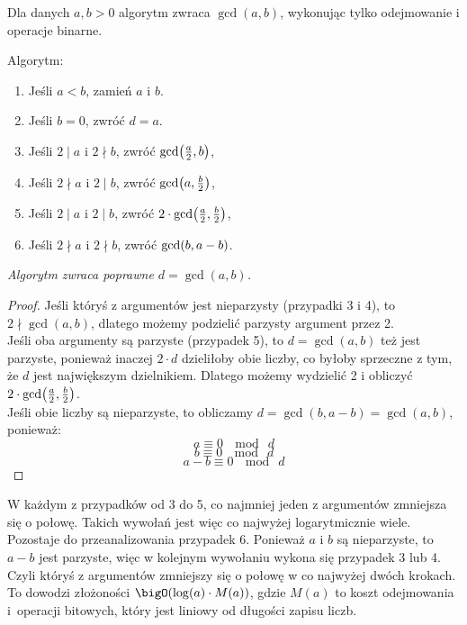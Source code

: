 Dla danych \( a,b > 0 \) algorytm zwraca \( \gcd(a,b) \), wykonując tylko odejmowanie i operacje binarne.

\begin{greyframe}
	Algorytm:
	\begin{enumerate}
		\item Jeśli \( a < b \), zamień \( a \) i \( b \).
		\item Jeśli \( b = 0 \), zwróć \( d = a \).
		\item Jeśli \( 2 \mid a \) i \( 2 \nmid b \), zwróć \( \gcd\pars{\frac{a}{2}, b} \),
		\item Jeśli \( 2 \nmid a \) i \( 2 \mid b \), zwróć \( \gcd\pars{a, \frac{b}{2}} \),
		\item Jeśli \( 2 \mid a \) i \( 2 \mid b \), zwróć \( 2 \cdot \gcd\pars{\frac{a}{2}, \frac{b}{2}} \),
		\item Jeśli \( 2 \nmid a \) i \( 2 \nmid b \), zwróć \( \gcd\pars{b, a - b} \).
	\end{enumerate}
\end{greyframe}

\vspace{1em}\noindent
\textit{Algorytm zwraca poprawne \( d = \gcd(a, b) \).}
\begin{proof}
	Jeśli któryś z argumentów jest nieparzysty (przypadki 3 i 4), to \( 2 \nmid \gcd(a, b) \), dlatego możemy podzielić parzysty argument przez 2. \\
	Jeśli oba argumenty są parzyste (przypadek 5), to \( d = \gcd(a, b) \) też jest parzyste, ponieważ inaczej \( 2 \cdot d \) dzieliłoby obie liczby, co byłoby sprzeczne z tym, że \( d \) jest największym dzielnikiem.
	Dlatego możemy wydzielić 2 i obliczyć \( 2 \cdot \gcd\pars{\frac{a}{2}, \frac{b}{2}} \). \\
	Jeśli obie liczby są nieparzyste, to obliczamy \( d = \gcd(b, a - b) = \gcd(a, b) \), ponieważ:
	\[
		a \equiv 0 \ \mod \ d
	\]
	\[
		b \equiv 0 \ \mod \ d
	\]
	\[
		a - b \equiv 0 \ \mod \ d
	\]
\end{proof}

W każdym z przypadków od 3 do 5, co najmniej jeden z argumentów zmniejsza się o połowę. Takich wywołań jest więc co najwyżej logarytmicznie wiele.
Pozostaje do przeanalizowania przypadek 6. Ponieważ \( a \) i \( b \) są nieparzyste, to \( a - b \) jest parzyste, więc w kolejnym wywołaniu wykona się przypadek 3 lub 4. Czyli któryś z argumentów zmniejszy się o połowę w co najwyżej dwóch krokach.
To dowodzi złożoności \( \bigO(\log(a) \cdot M(a)) \), gdzie \( M(a) \) to koszt odejmowania i~operacji bitowych, który jest liniowy od długości zapisu liczb.